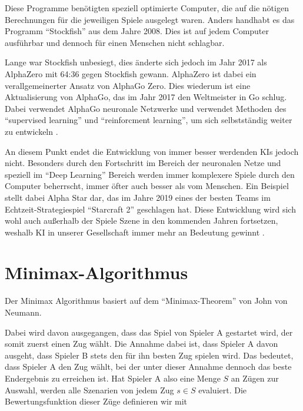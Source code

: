 
Diese Programme benötigten speziell optimierte Computer, die auf die nötigen Berechnungen für die jeweiligen Spiele ausgelegt waren. Anders handhabt es das Programm ``Stockfish'' aus dem Jahre 2008. Dies ist auf jedem Computer ausführbar und dennoch für einen Menschen nicht schlagbar.

Lange war Stockfish unbesiegt, dies änderte sich jedoch im Jahr 2017 als AlphaZero mit 64:36 gegen Stockfish gewann. AlphaZero ist dabei ein verallgemeinerter Ansatz von AlphaGo Zero. Dies wiederum ist eine Aktualisierung von AlphaGo, das im Jahr 2017 den Weltmeister in Go schlug. Dabei verwendet AlphaGo neuronale Netzwerke und verwendet Methoden des ``supervised learning'' und ``reinforcment learning'', um sich selbstständig weiter zu entwickeln \cite{Fischer}.


An diesem Punkt endet die Entwicklung von immer besser werdenden KIs jedoch nicht. Besonders durch den Fortschritt im Bereich der neuronalen Netze und speziell im ``Deep Learning'' Bereich werden immer komplexere Spiele durch den Computer beherrscht, immer öfter auch besser als vom Menschen. Ein Beispiel stellt dabei Alpha Star dar, das im Jahre 2019 eines der besten Teams im Echtzeit-Strategiespiel ``Starcraft 2'' geschlagen hat. Diese Entwicklung wird sich wohl auch außerhalb der Spiele Szene in den kommenden Jahren fortsetzen, weshalb KI in unserer Gesellschaft immer mehr an Bedeutung gewinnt  \cite{OriolVinyalsIgorBabuschkinJunyoungChungMichaelMathieuMaxJaderbergWojtekCzarneckiAndrewDudzikAjaHuangPetkoGeorgievRichardPowellTimoEwaldsDanHorganManuelKroissIvoDanihelkaJohnAgapiouJunhyukOhValentinDalibard}.


\section{Minimax-Algorithmus}\label{minimax}

Der Minimax Algorithmus basiert auf dem ``Minimax-Theorem'' von John von Neumann.

Dabei wird davon ausgegangen, dass das Spiel von Spieler A gestartet wird, der somit zuerst einen Zug wählt. Die Annahme dabei ist, dass Spieler A davon ausgeht, dass Spieler B stets den für ihn besten Zug spielen wird. Das bedeutet, dass Spieler A den Zug wählt, bei der unter dieser Annahme dennoch das beste Endergebnis zu erreichen ist. Hat Spieler A also eine Menge $S$ an Zügen zur Auswahl, werden alle Szenarien von jedem Zug $s \in S$ evaluiert. Die Bewertungsfunktion dieser Züge definieren wir mit

